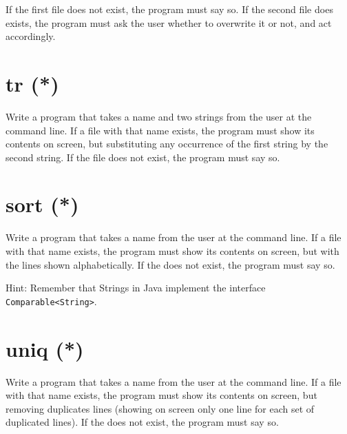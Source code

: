 \documentclass{article}
\begin{document}
If the first file does not exist, the program must say so. If the
second file does exists, the program must ask the user whether to
overwrite it or not, and act accordingly.

%


\section{tr (*)}
\label{sec:tr}

Write a program that takes a name and two strings from the user at the
command line. If a file with that name exists, the program must show
its contents on screen, but substituting any occurrence of the first
string by the second string. If the file does not exist, the program
must say so.

\section{sort (*)}
\label{sec:sort-}

Write a program that takes a name from the user at the command
line. If a file with that name exists, the program must show its
contents on screen, but with the lines shown alphabetically. If the
does not exist, the program must say so. 

Hint: Remember that Strings in Java implement the interface
\verb+Comparable<String>+. 

\section{uniq (*)}
\label{sec:uniq-}

Write a program that takes a name from the user at the command
line. If a file with that name exists, the program must show its
contents on screen, but removing duplicates lines (showing on screen 
only one line for each set of duplicated lines). If the
does not exist, the program must say so. 
\end{document}
